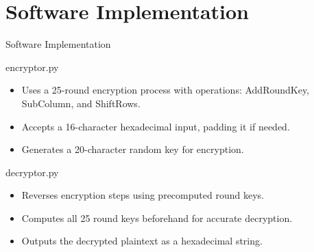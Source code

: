 \section{Software Implementation}

\begin{frame}{Software Implementation}
    \begin{block}{encryptor.py}
        \begin{itemize}
            \item Uses a 25-round encryption process with operations: AddRoundKey, SubColumn, and ShiftRows.
            \item Accepts a 16-character hexadecimal input, padding it if needed.
            \item Generates a 20-character random key for encryption.
        \end{itemize}
    \end{block}

    \begin{block}{decryptor.py}
        \begin{itemize}
            \item Reverses encryption steps using precomputed round keys.
            \item Computes all 25 round keys beforehand for accurate decryption.
            \item Outputs the decrypted plaintext as a hexadecimal string.
        \end{itemize}
    \end{block}
\end{frame}

